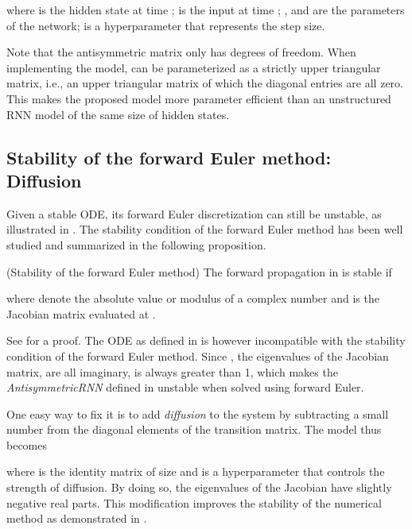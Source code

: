 where
 is the hidden state at time ;
 is the input at time ; 
,  and  are the parameters of the network;
 is a hyperparameter that represents the step size.




Note that the antisymmetric matrix  only has  degrees of freedom.
When implementing the model, 
 can be parameterized as a strictly upper triangular matrix, 
i.e., an upper triangular matrix of which the diagonal entries are all zero.
This makes the proposed model more parameter efficient than an unstructured RNN model of the same size of hidden states.


\subsection{Stability of the forward Euler method: Diffusion}

Given a stable ODE, its forward Euler discretization can still be unstable, as illustrated in .
The stability condition of the forward Euler method has been well studied and summarized in the following proposition.
\begin{proposition}
\label{prop:forward_Euler_stability}
(Stability of the forward Euler method) 
The forward propagation in  is stable if

where  denote the absolute value or modulus of a complex number and  is the Jacobian matrix evaluated at .
\end{proposition}
See \cite{ascher1998computer} for a proof.
The ODE as defined in  is however incompatible with the stability condition of the forward Euler method.
Since , the eigenvalues of the Jacobian matrix, are all imaginary,  is always greater than 1, which makes the \textit{AntisymmetricRNN} defined in  unstable when solved using forward Euler.


One easy way to fix it is to add \textit{diffusion} to the system by subtracting a small number  from the diagonal elements of the transition matrix.
The model thus becomes

where  is the identity matrix of size  and  is a hyperparameter that controls the strength of diffusion.
By doing so, the eigenvalues of the Jacobian have slightly negative real parts. 
This modification improves the stability of the numerical method as demonstrated in .





